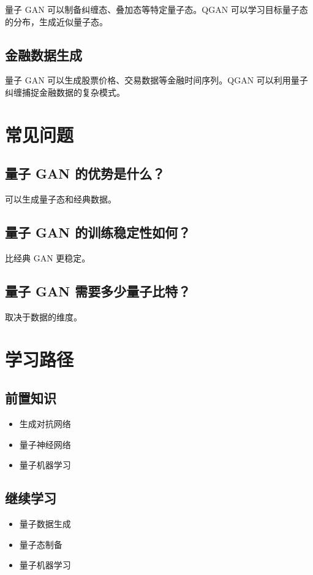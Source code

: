 \documentclass[12pt,a4paper]{article}
\begin{document}
量子 GAN 可以制备纠缠态、叠加态等特定量子态。QGAN 可以学习目标量子态的分布，生成近似量子态。

\subsection{金融数据生成}

量子 GAN 可以生成股票价格、交易数据等金融时间序列。QGAN 可以利用量子纠缠捕捉金融数据的复杂模式。

\section{常见问题}

\subsection{量子 GAN 的优势是什么？}

可以生成量子态和经典数据。

\subsection{量子 GAN 的训练稳定性如何？}

比经典 GAN 更稳定。

\subsection{量子 GAN 需要多少量子比特？}

取决于数据的维度。

\section{学习路径}

\subsection{前置知识}
\begin{itemize}
  \item 生成对抗网络
  \item 量子神经网络
  \item 量子机器学习
\end{itemize}

\subsection{继续学习}
\begin{itemize}
  \item 量子数据生成
  \item 量子态制备
  \item 量子机器学习
\end{itemize}
\end{document}
